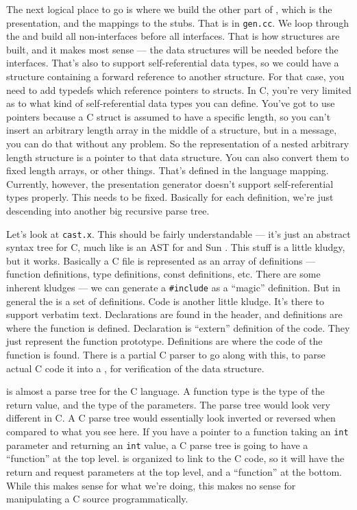 The next logical place to go is where we build the other part of \PRESC{},
which is the presentation, and the mappings to the stubs.  That is in
\texttt{gen.cc}.  We loop through the \AOI{} and build all non-interfaces before
all interfaces.  That is how \rpcgen{} structures are built, and it makes most
sense --- the data structures will be needed before the interfaces.  That's
also to support self-referential data types, so we could have a structure
containing a forward reference to another structure.  For that case, you need
to add typedefs which reference pointers to structs.  In C, you're very limited
as to what kind of self-referential data types you can define.  You've got to
use pointers because a C struct is assumed to have a specific length, so you
can't insert an arbitrary length array in the middle of a structure, but in a
message, you can do that without any problem.  So the representation of a
nested arbitrary length structure is a pointer to that data structure.  You can
also convert them to fixed length arrays, or other things.  That's defined in
the language mapping.  Currently, however, the presentation generator doesn't
support self-referential types properly.  This needs to be fixed.  Basically
for each \AOI{} definition, we're just descending into another big recursive parse
tree.

Let's look at \texttt{cast.x}.  This should be fairly understandable --- it's
just an abstract syntax tree for C, much like \AOI{} is an AST for \CORBA{} and Sun
\IDL{}\@.  This stuff is a little kludgy, but it works.  Basically a C file is
represented as an array of definitions --- function definitions, type
definitions, const definitions, etc.  There are some inherent kludges --- we
can generate a \texttt{\#include} as a ``magic'' definition.  But in general
the \IDL{} is a set of definitions.  Code is another little kludge.  It's there to
support verbatim text.  Declarations are found in the header, and definitions
are where the function is defined.  Declaration is ``extern'' definition of the
code.  They just represent the function prototype.  Definitions are where the
code of the function is found.  There is a partial C parser to go along with
this, to parse actual C code it into a \CAST{}, for verification of the data
structure.

\CAST{} is almost a parse tree for the C language.  A function type is the type of
the return value, and the type of the parameters.  The parse tree would look
very different in C\@.  A C parse tree would essentially look inverted or
reversed when compared to what you see here.  If you have a pointer to a
function taking an \texttt{int} parameter and returning an \texttt{int} value,
a C parse tree is going to have a ``function'' at the top level.  \CAST{} is
organized to link \MINT{} to the C code, so it will have the return and request
parameters at the top level, and a ``function'' at the bottom.  While this
makes sense for what we're doing, this makes no sense for manipulating a C
source programmatically.


